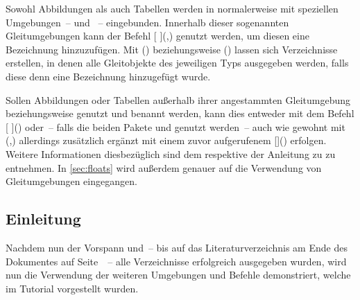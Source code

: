 \documentclass[%
  english,ngerman,%
  cdgeometry=no,DIV=12,automark,%
]{tudscrartcl}
\begin{document}
Sowohl Abbildungen als auch Tabellen werden in  normalerweise 
mit speziellen Umgebungen~--  und ~-- 
eingebunden. Innerhalb dieser sogenannten Gleitumgebungen kann der Befehl 
[%
](,) genutzt werden, um diesen eine 
Bezeichnung hinzuzufügen. Mit () 
beziehungsweise () lassen sich 
Verzeichnisse erstellen, in denen alle Gleitobjekte des jeweiligen Typs 
ausgegeben werden, falls diese denn eine Bezeichnung hinzugefügt wurde. 

Sollen Abbildungen oder Tabellen außerhalb ihrer angestammten Gleitumgebung 
 beziehungsweise  genutzt und benannt 
werden, kann dies entweder mit dem Befehl 
[%
]() oder~-- falls die beiden Pakete  und 
 genutzt werden~-- auch wie gewohnt mit 
(,) allerdings zusätzlich 
ergänzt mit einem zuvor aufgerufenem
[]()  
erfolgen. Weitere Informationen diesbezüglich sind dem \scrguide respektive der 
Anleitung zu  zu entnehmen. In \autoref{sec:floats} wird 
außerdem genauer auf die Verwendung von Gleitumgebungen eingegangen.
%
\begin{Trunk}
\tableofcontents
\listoffigures
\listoftables

\end{Trunk}
\begin{Trunk+}
\printacronyms[style=acrotabu]
\printsymbols[style=symblongtabu]

\chapter{Einleitung}
Nachdem nun der Vorspann und~-- bis auf das Literaturverzeichnis am 
Ende des Dokumentes auf Seite~\pageref{sec:bibliography}~-- alle 
Verzeichnisse erfolgreich ausgegeben wurden, wird nun die Verwendung 
der weiteren Umgebungen und Befehle demonstriert, welche im Tutorial 
 vorgestellt wurden.

\end{Trunk+}
\end{document}
